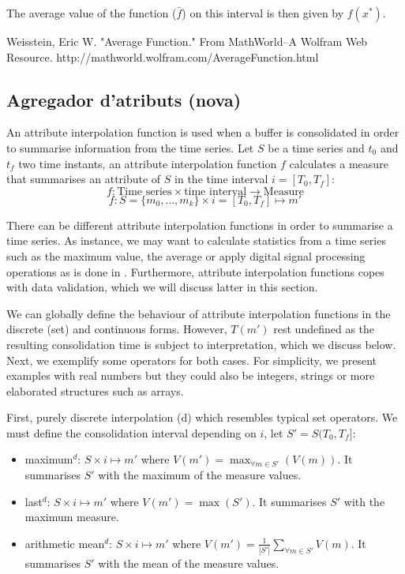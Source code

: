 The average value of the function ($\bar f$)  on this interval is then given by  $f(x^*)$.

Weisstein, Eric W. "Average Function." From MathWorld--A Wolfram Web Resource. http://mathworld.wolfram.com/AverageFunction.html






\subsection{Agregador d'atributs (nova)}



An attribute interpolation function is used when a buffer is
consolidated in order to summarise information from the time series.
Let $S$ be a time series and $t_0$ and $t_f$ two time instants, an
attribute interpolation function $f$ calculates a measure that
summarises an attribute of $S$ in the time interval $i=[T_0,T_f]$:
\[
f: \text{Time series} \times \text{time interval} \longrightarrow
\text{Measure}
\]
\[
f: S=\{m_0,\ldots,m_k\} \times i=[T_0,T_f] \mapsto m'
\]

There can be different attribute interpolation functions in order to
summarise a time series. As instance, we may want to calculate
statistics from a time series such as the maximum value, the average
or apply digital signal processing operations as is done in
\cite{zhang11}.  Furthermore, attribute interpolation functions copes
with data validation, which we will discuss latter in this section.

We can globally define the behaviour of attribute interpolation
functions in the discrete (set) and continuous forms. However, $T(m')$
rest undefined as the resulting consolidation time is subject to
interpretation, which we discuss below. Next, we exemplify some
operators for both cases. For simplicity, we present examples with
real numbers but they could also be integers, strings or more
elaborated structures such as arrays.


First, purely discrete interpolation (d) which resembles typical set
operators. We must define the consolidation interval depending on $i$,
let $S'=S(T_0,T_f]$:
\begin{itemize}
\item maximum$^d$: $S \times i \mapsto m'$ where $V(m') = \max_{\forall m
    \in S'}(V(m))$. It summarises $S'$ with the maximum of
  the measure values.
\item last$^d$: $S \times i \mapsto m'$ where $V(m') = \max(S')$. It
  summarises $S'$ with the maximum measure.
\item arithmetic mean$^d$: $S \times i \mapsto m'$ where $V(m') =
  \frac{1}{|S'|} \sum\limits_{\forall m\in S'} V(m)$. It
  summarises $S'$ with the mean of the measure values.
\end{itemize}


